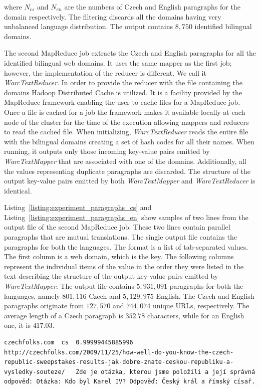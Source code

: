 where $N_{cs}$ and $N_{en}$ are the numbers of Czech and English paragraphs for the domain respectively. The filtering discards all the domains having very unbalanced language distribution. The output contains $8,750$ identified bilingual domains.

The second MapReduce job extracts the Czech and English paragraphs for all the identified bilingual web domains. It uses the same mapper as the first job; however, the implementation of the reducer is different. We call it \textit{WarcTextReducer}. In order to provide the reducer with the file containing the domains Hadoop Distributed Cache is utilized. It is a facility provided by the MapReduce framework enabling the user to cache files for a MapReduce job. Once a file is cached for a job the framework makes it available locally at each node of the cluster for the time of the execution allowing mappers and reducers to read the cached file. When initializing, \textit{WarcTextReducer} reads the entire file with the bilingual domains creating a set of hash codes for all their names. When running, it outputs only those incoming key-value pairs emitted by \textit{WarcTextMapper} that are associated with one of the domains. Additionally, all the values representing duplicate paragraphs are discarded. The structure of the output key-value pairs emitted by both \textit{WarcTextMapper} and \textit{WarcTextReducer} is identical.

Listing~\ref{listing:experiment_paragraphs_cs} and Listing~\ref{listing:experiment_paragraphs_en} show samples of two lines from the output file of the second MapReduce job. These two lines contain parallel paragraphs that are mutual translations. The single output file contains the paragraphs for both the languages. The format is a list of tab-separated values. The first column is a web domain, which is the key. The following columns represent the individual items of the value in the order they were listed in the text describing the structure of the output key-value pairs emitted by \textit{WarcTextMapper}. The output file contains $5,931,091$ paragraphs for both the languages, namely $801,116$ Czech and $5,129,975$ English. The Czech and English paragraphs originate from $127,570$ and $744,074$ unique URLs, respectively. The average length of a Czech paragraph is $352.78$ characters, while for an English one, it is $417.03$.

\begin{lstlisting}[float=!htb,caption={sample from a file with extracted paragraphs (Czech)},label={listing:experiment_paragraphs_cs},firstnumber=3185636]
czechfolks.com	cs	0.99999445885996	http://czechfolks.com/2009/11/25/how-well-do-you-know-the-czech-republic-sweepstakes-results-jak-dobre-znate-ceskou-republiku-a-vysledky-souteze/	Zde je otázka, kterou jsme položili a její správná odpověď: Otázka: Kdo byl Karel IV? Odpověď: Český král a římský císař.
\end{lstlisting}

